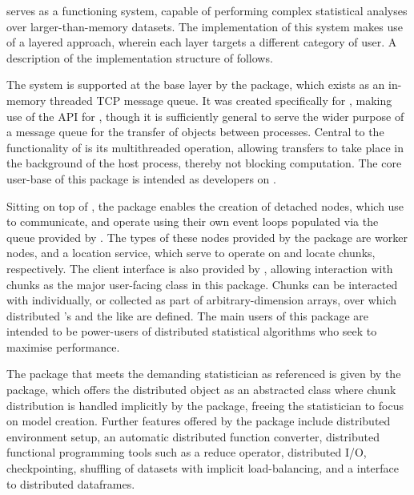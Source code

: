 \lsr{} serves as a functioning system, capable of performing complex statistical analyses over larger-than-memory datasets.
The implementation of this system makes use of a layered approach, wherein each layer targets a different category of user.
A description of the implementation structure of \lsr{} follows.

The system is supported at the base layer by the  package, which exists as an in-memory threaded TCP message queue.
It was created specifically for , making use of the  API for \R{}, though it is sufficiently general to serve the wider purpose of a message queue for the transfer of \R{} objects between \R{} processes.
Central to the functionality of  is its multithreaded operation, allowing transfers to take place in the background of the host \R{} process, thereby not blocking computation.
The core user-base of this package is intended as developers on \lsr{}.

Sitting on top of , the package  enables the creation of detached nodes, which use  to communicate, and operate using their own event loops populated via the queue provided by .
The types of these nodes provided by the package are worker nodes, and a location service, which serve to operate on and locate chunks, respectively.
The client interface is also provided by , allowing interaction with chunks as the major user-facing class in this package.
Chunks can be interacted with individually, or collected as part of arbitrary-dimension arrays, over which distributed 's and the like are defined.
The main users of this package are intended to be power-users of distributed statistical algorithms who seek to maximise performance.

The package that meets the demanding statistician as referenced is given by the \lsr{} package, which offers the distributed object as an abstracted class where chunk distribution is handled implicitly by the package, freeing the statistician to focus on model creation.
Further features offered by the package include distributed environment setup, an automatic distributed function converter, distributed functional programming tools such as a reduce operator, distributed I/O, checkpointing, shuffling of datasets with implicit load-balancing, and a  interface to distributed dataframes.
